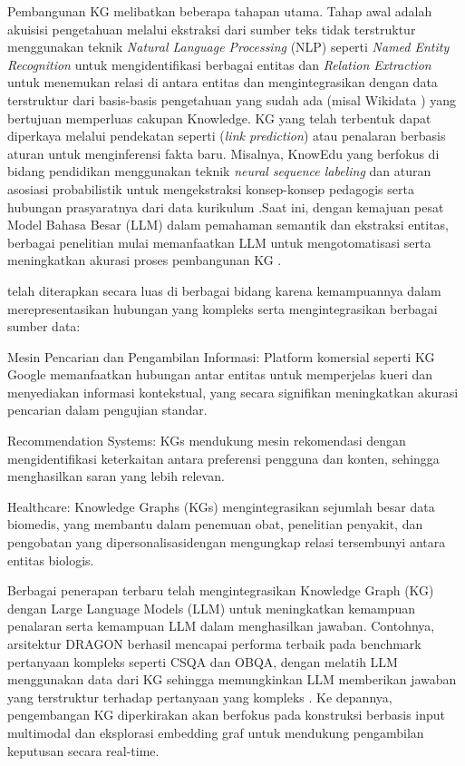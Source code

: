 Pembangunan KG melibatkan beberapa tahapan utama. Tahap awal adalah akuisisi pengetahuan melalui ekstraksi dari sumber teks tidak terstruktur menggunakan teknik \textit{Natural Language Processing} (NLP) seperti \textit{Named Entity Recognition} untuk mengidentifikasi berbagai entitas dan \textit{Relation Extraction} untuk menemukan relasi di antara entitas dan mengintegrasikan dengan data terstruktur dari basis-basis pengetahuan yang sudah ada (misal Wikidata \cite{wikidata}) yang bertujuan memperluas cakupan Knowledge. KG yang telah terbentuk dapat diperkaya melalui pendekatan seperti (\textit{link prediction}) atau penalaran berbasis aturan untuk menginferensi fakta baru. Misalnya, KnowEdu yang berfokus di bidang pendidikan menggunakan teknik \textit{neural sequence labeling} dan aturan asosiasi probabilistik untuk mengekstraksi konsep-konsep pedagogis serta hubungan prasyaratnya dari data kurikulum \cite{knowedu}.Saat ini, dengan kemajuan pesat Model Bahasa Besar (LLM) dalam pemahaman semantik dan ekstraksi entitas, berbagai penelitian mulai memanfaatkan LLM untuk mengotomatisasi serta meningkatkan akurasi proses pembangunan KG \cite{edge2025localglobalgraphrag}.
		
telah diterapkan secara luas di berbagai bidang karena kemampuannya dalam merepresentasikan hubungan yang kompleks serta mengintegrasikan berbagai sumber data:  
\begin{daftar}
	\item Mesin Pencarian dan Pengambilan Informasi: Platform komersial seperti KG Google memanfaatkan hubungan antar entitas untuk memperjelas kueri dan menyediakan informasi kontekstual, yang secara signifikan meningkatkan akurasi pencarian dalam pengujian standar.  
	\item Recommendation Systems: KGs mendukung mesin rekomendasi dengan mengidentifikasi keterkaitan antara preferensi pengguna dan konten, sehingga menghasilkan saran yang lebih relevan.
	\item Healthcare: Knowledge Graphs (KGs) mengintegrasikan sejumlah besar data biomedis, yang membantu dalam penemuan obat, penelitian penyakit, dan pengobatan yang dipersonalisasidengan mengungkap relasi tersembunyi antara entitas biologis.
\end{daftar}

Berbagai penerapan terbaru telah mengintegrasikan Knowledge Graph (KG) dengan Large Language Models (LLM) untuk meningkatkan kemampuan penalaran serta kemampuan LLM dalam menghasilkan jawaban. Contohnya, arsitektur DRAGON \cite{yasunaga2022deepbidirectionallanguageknowledgegraph} berhasil mencapai performa terbaik pada benchmark pertanyaan kompleks seperti CSQA dan OBQA, dengan melatih LLM menggunakan data dari KG sehingga memungkinkan LLM memberikan jawaban yang terstruktur terhadap pertanyaan yang kompleks \cite{saha2018complexsequentialquestionanswering, mihaylov2018suitarmorconductelectricity}. Ke depannya, pengembangan KG diperkirakan akan berfokus pada konstruksi berbasis input multimodal dan eksplorasi embedding graf untuk mendukung pengambilan keputusan secara real-time.
		
